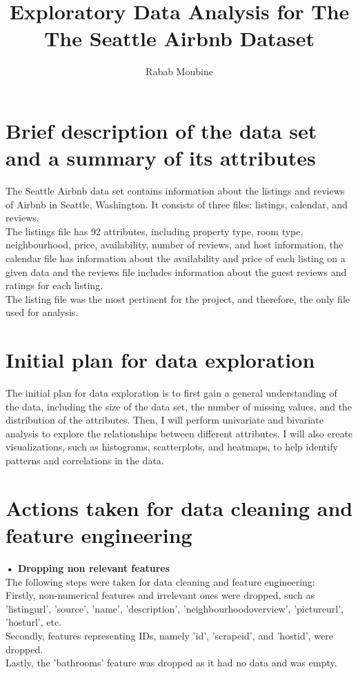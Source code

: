 \documentclass{article}
\begin{document}
\title{Exploratory Data Analysis for The The Seattle Airbnb Dataset}
\author{Rabab Moubine}
\maketitle

\section{Brief description of the data set and a summary of its attributes}

The Seattle Airbnb data set contains information about the listings and reviews of Airbnb in Seattle, Washington. It consists of three files: listings, calendar, and reviews. \\
The listings file has 92 attributes, including property type, room type, neighbourhood, price, availability, number of reviews, and host information, the calendar file has information about the availability and price of each listing on a given data and the reviews file includes information about the guest reviews and ratings for each listing. \\
The listing file was the most pertinent for the project, and therefore, the only file used for analysis.

\section{Initial plan for data exploration}

The initial plan for data exploration is to first gain a general understanding of the data, including the size of the data set, the number of missing values, and the distribution of the attributes. Then, I will perform univariate and bivariate analysis to explore the relationships between different attributes. 
I will also create visualizations, such as histograms, scatterplots, and heatmaps, to help identify patterns and correlations in the data.                                                                                                   

\section{Actions taken for data cleaning and feature engineering}
\textbf{• Dropping non relevant features}\\
The following steps were taken for data cleaning and feature engineering:\\
Firstly, non-numerical features and irrelevant ones were dropped, such as 'listing\textunderscore url', 'source', 'name', 'description', 'neighbourhood\textunderscore overview', 'picture\textunderscore url', 'host\textunderscore url', etc. \\
Secondly, features representing IDs, namely 'id', 'scrape\textunderscore id', and 'host\textunderscore id', were dropped. \\
Lastly, the 'bathrooms' feature was dropped as it had no data and was empty.\vspace{.5cm}
\end{document}
